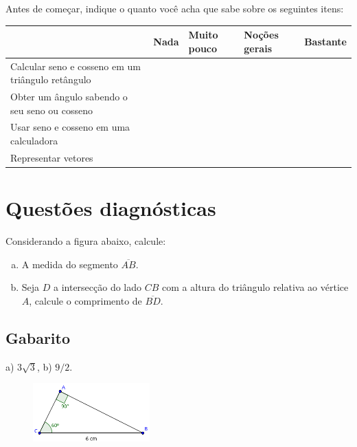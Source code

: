\documentclass[main.tex]{subfiles}
\begin{document}
\paraFolhaAvaliacoes

Antes de começar, indique o quanto você acha que sabe sobre os seguintes itens:

\begin{center}
 \begin{tabular}{|p{35mm}||p{15mm}|p{15mm}|p{15mm}|p{15mm}|} 
 \hline
   & Nada & Muito pouco & Noções gerais & Bastante\\
 \hline
 Calcular seno e cosseno em um triângulo retângulo &  &  &  &  \\ 
 \hline
 Obter um ângulo sabendo o seu seno ou cosseno &  &  &  &  \\
 \hline
 Usar seno e cosseno em uma calculadora &  &  &  &  \\
 \hline
 Representar vetores &  &  &  &  \\
 \hline
\end{tabular}
\end{center}

\paraAmbos

\section{Questões diagnósticas}

\begin{diagnostico}
Considerando a figura abaixo, calcule:
\begin{enumerate}[a)]
  \item A medida do segmento $\overline{AB}$.
  \item Seja $D$ a intersecção do lado $CB$ com a altura do triângulo relativa ao vértice $A$, calcule o comprimento de $\overline{BD}$.
\end{enumerate}
\end{diagnostico}

\paraTutores

\subsection{Gabarito}

a) $3\sqrt{3}$, b) $9/2$.

\paraAmbos
 
\begin{figure}[h]
\centering
\includegraphics[width=0.4\textwidth]{./img/c4d1.png}
\end{figure}
\end{document}
